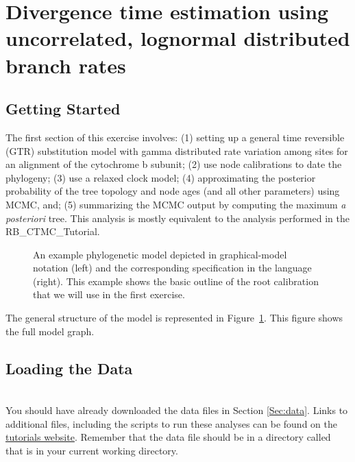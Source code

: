 \newpage
\FloatBarrier
\section{Divergence time estimation using uncorrelated, lognormal distributed branch rates}\label{sec:UCLN}

\bigskip
\subsection{Getting Started}


The first section of this exercise involves:
(1) setting up a general time reversible (GTR) substitution model \citep{Tavare1986} with gamma distributed rate variation among sites \citep{Yang1994a} for an alignment of the cytochrome b subunit;
(2) use node calibrations to date the phylogeny;
(3) use a relaxed clock model;
(4) approximating the posterior probability of the tree topology and node ages (and all other parameters) using MCMC, and; 
(5) summarizing the MCMC output by computing the maximum \textit{a posteriori} tree. 
This analysis is mostly equivalent to the analysis performed in the RB\_CTMC\_Tutorial.

\begin{figure}[h!]
\centering
{}
\caption{\small An example phylogenetic model depicted in graphical-model notation (left) and the corresponding specification in the \Rev language (right).
This example shows the basic outline of the root calibration that we will use in the first exercise.}
\label{fig:clock_prior}
\end{figure}

The general structure of the model is represented in Figure~\ref{fig:clock_prior}.
This figure shows the full model graph.


\bigskip

\subsection{Loading the Data}

\noindent \\ \impmark You should have already downloaded the data files in Section \ref{Sec:data}. 
Links to additional files, including the scripts to run these analyses can be found on the \href{http://revbayes.github.io/tutorials.html}{\RevBayes tutorials website}. 
Remember that the data file should be in a directory called  that is in your current working directory.

